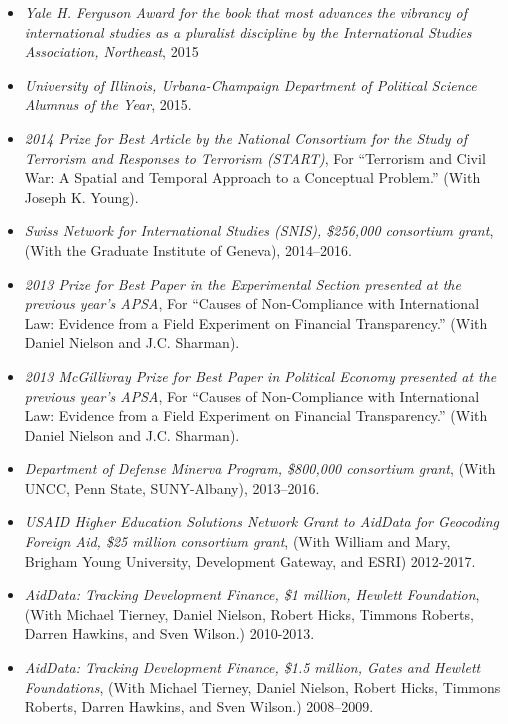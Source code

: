 \documentclass[10pt]{article}
\begin{document}
\begin{itemize}
\item \textit{Yale H. Ferguson Award for the book that most advances the vibrancy of international studies as a pluralist discipline by the International Studies Association, Northeast}, 2015

\item \textit{University of Illinois, Urbana-Champaign Department of Political Science Alumnus of the Year}, 2015. 

\item \textit{2014 Prize for Best Article by the National Consortium for the Study of Terrorism and Responses to Terrorism (START)}, For ``Terrorism and Civil War: A Spatial and Temporal Approach to a Conceptual Problem.'' (With Joseph K. Young).

\item \textit{Swiss Network for International Studies (SNIS), \$256,000 consortium grant}, (With the Graduate Institute of Geneva), 2014--2016.

\item \textit{2013 Prize for Best Paper in the Experimental Section presented at the previous year's APSA}, For ``Causes of Non-Compliance with International Law: Evidence from a Field Experiment on Financial Transparency.'' (With Daniel Nielson and J.C. Sharman).

\item \textit{2013 McGillivray Prize for Best Paper in Political Economy presented at the previous year's APSA}, For ``Causes of Non-Compliance with International Law: Evidence from a Field Experiment on Financial Transparency.'' (With Daniel Nielson and J.C. Sharman).

\item \textit{Department of Defense Minerva Program, \$800,000 consortium grant}, (With UNCC, Penn State, SUNY-Albany), 2013--2016.

\item \textit{USAID Higher Education Solutions Network Grant to AidData for Geocoding Foreign Aid, \$25 million consortium grant}, (With William and Mary, Brigham Young University, Development Gateway, and ESRI) 2012-2017.

\item \textit{AidData: Tracking Development Finance, \$1 million, Hewlett Foundation}, (With Michael Tierney, Daniel Nielson, Robert Hicks, Timmons Roberts, Darren Hawkins, and Sven Wilson.) 2010-2013. 

\item \textit{AidData: Tracking Development Finance, \$1.5 million, Gates and Hewlett Foundations}, (With Michael Tierney, Daniel Nielson, Robert Hicks, Timmons Roberts, Darren Hawkins, and Sven Wilson.) 2008--2009.


\end{itemize}
\end{document}
